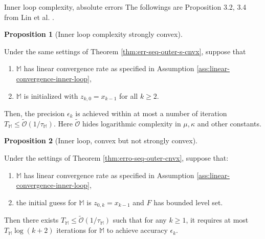 \documentclass[11pt]{beamer}
\theoremstyle{definition}
\newtheorem{proposition}{Proposition}[section]
\begin{document}
        \begin{frame}{Inner loop complexity, absolute errors}
            The followings are Proposition 3.2, 3.4 from Lin et al. \cite{lin_universal_2015}. 
            \begin{proposition}[Inner loop complexity strongly convex]\label{prop:inner-loop-complexity-s-cnvx}
            {\footnotesize
                Under the same settings of Theorem \ref{thm:err-seq-outer-s-cnvx}, suppose that 
                \begin{enumerate}
                    \item $\mathbb M$ has linear convergence rate as specified in Assumption \ref{ass:linear-convergence-inner-loop}, 
                    \item $\mathbb M$ is initialized with  $z_{k, 0} = x_{k - 1}$ for all $k \ge 2$. 
                \end{enumerate}
                Then, the precision $\epsilon_k$ is achieved within at most a number of iteration $T_{\mathbb M} \le \widetilde {\mathcal O}(1/ \tau_{\mathbb M})$. 
                Here $\widetilde{\mathcal O}$ hides logarithmic complexity in $\mu, \kappa$ and other constants. 
            }
            \end{proposition}
            \begin{proposition}[Inner loop, convex but not strongly convex]\label{prop:inner-loop-complexity-cnvx}
            {\footnotesize
                Under the settings of Theorem \ref{thm:erro-seq-outer-cnvx}, suppose that:
                \begin{enumerate}
                    \item $\mathbb M$ has linear convergence rate as specified in Assumption \ref{ass:linear-convergence-inner-loop}, 
                    \item the initial guess for $\mathbb M$ is $z_{0, k} = x_{k - 1}$ and $F$ has bounded level set.
                \end{enumerate}
                Then there exists $T_{\mathbb M} \le \widetilde{\mathcal O}(1 / \tau_{\mathbb M})$ such that for any $k \ge 1$, it requires at most\\ $T_{\mathbb M}\log(k + 2)$ iterations for $\mathbb M$ to achieve accuracy $\epsilon_k$.
            }
            \end{proposition}
        \end{frame}
\end{document}
